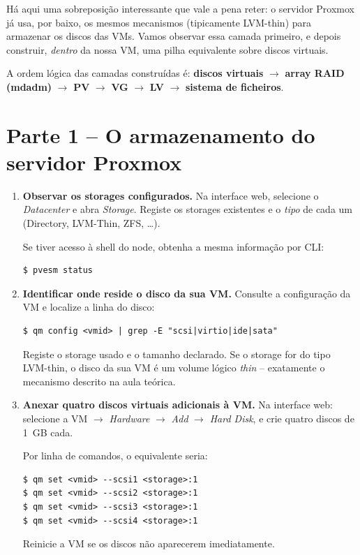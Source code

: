 \documentclass[11pt,a4paper]{article}
\begin{document}
Há aqui uma sobreposição interessante que vale a pena reter: o servidor Proxmox já usa, por baixo, os mesmos mecanismos (tipicamente LVM-thin) para armazenar os discos das VMs. Vamos observar essa camada primeiro, e depois construir, \emph{dentro} da nossa VM, uma pilha equivalente sobre discos virtuais.

A ordem lógica das camadas construídas é: \textbf{discos virtuais} $\rightarrow$ \textbf{array RAID (mdadm)} $\rightarrow$ \textbf{PV} $\rightarrow$ \textbf{VG} $\rightarrow$ \textbf{LV} $\rightarrow$ \textbf{sistema de ficheiros}.

\section{Parte 1 -- O armazenamento do servidor Proxmox}
\begin{enumerate}[label=\arabic*.]

    \item \textbf{Observar os storages configurados.} Na interface web, selecione o \emph{Datacenter} e abra \emph{Storage}. Registe os storages existentes e o \emph{tipo} de cada um (Directory, LVM-Thin, ZFS, \ldots).

    Se tiver acesso à shell do node, obtenha a mesma informação por CLI:
\begin{lstlisting}
$ pvesm status
\end{lstlisting}

    \item \textbf{Identificar onde reside o disco da sua VM.} Consulte a configuração da VM e localize a linha do disco:
\begin{lstlisting}
$ qm config <vmid> | grep -E "scsi|virtio|ide|sata"
\end{lstlisting}
    Registe o storage usado e o tamanho declarado. Se o storage for do tipo LVM-thin, o disco da sua VM é um volume lógico \emph{thin} -- exatamente o mecanismo descrito na aula teórica.

    \item \textbf{Anexar quatro discos virtuais adicionais à VM.} Na interface web: selecione a VM $\rightarrow$ \emph{Hardware} $\rightarrow$ \emph{Add} $\rightarrow$ \emph{Hard Disk}, e crie quatro discos de 1~GB cada.

    Por linha de comandos, o equivalente seria:
\begin{lstlisting}
$ qm set <vmid> --scsi1 <storage>:1
$ qm set <vmid> --scsi2 <storage>:1
$ qm set <vmid> --scsi3 <storage>:1
$ qm set <vmid> --scsi4 <storage>:1
\end{lstlisting}
    Reinicie a VM se os discos não aparecerem imediatamente.

\end{enumerate}
\end{document}
